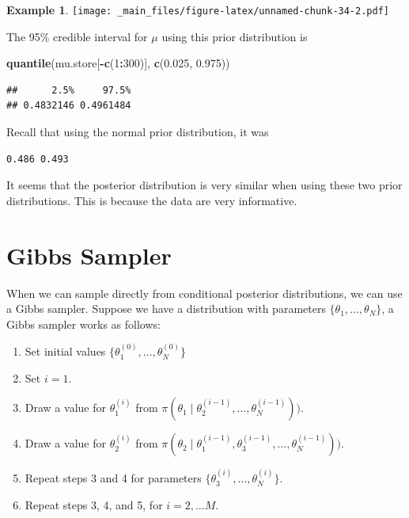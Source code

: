 \documentclass[
]{book}
\newenvironment{Shaded}{\begin{snugshade}}{\end{snugshade}}
\newcommand{\DecValTok}[1]{\textcolor[rgb]{0.00,0.00,0.81}{#1}}
\newcommand{\FloatTok}[1]{\textcolor[rgb]{0.00,0.00,0.81}{#1}}
\newcommand{\FunctionTok}[1]{\textcolor[rgb]{0.13,0.29,0.53}{\textbf{#1}}}
\newcommand{\NormalTok}[1]{#1}
\newcommand{\SpecialCharTok}[1]{\textcolor[rgb]{0.81,0.36,0.00}{\textbf{#1}}}
\theoremstyle{definition}
\theoremstyle{definition}
\newtheorem{example}{Example}[chapter]
\theoremstyle{definition}
\theoremstyle{definition}
\theoremstyle{remark}
\begin{document}
\begin{example}
\texttt{[image: \_main\_files/figure-latex/unnamed-chunk-34-2.pdf]}

The 95\% credible interval for \(\mu\) using this prior distribution is

\begin{Shaded}
\begin{Highlighting}[]
\FunctionTok{quantile}\NormalTok{(mu.store[}\SpecialCharTok{{-}}\FunctionTok{c}\NormalTok{(}\DecValTok{1}\SpecialCharTok{:}\DecValTok{300}\NormalTok{)], }\FunctionTok{c}\NormalTok{(}\FloatTok{0.025}\NormalTok{, }\FloatTok{0.975}\NormalTok{))}
\end{Highlighting}
\end{Shaded}

\begin{verbatim}
##      2.5%     97.5% 
## 0.4832146 0.4961484
\end{verbatim}

Recall that using the normal prior distribution, it was

\begin{verbatim}
0.486 0.493
\end{verbatim}

It seems that the posterior distribution is very similar when using these two prior distributions. This is because the data are very informative.
\end{example}

\hypertarget{gibbs-sampler}{%
\section{Gibbs Sampler}\label{gibbs-sampler}}

When we can sample directly from conditional posterior distributions, we can use a Gibbs sampler. Suppose we have a distribution with parameters \(\{\theta_1, \ldots, \theta_N\}\), a Gibbs sampler works as follows:

\begin{enumerate}
\def\labelenumi{\arabic{enumi}.}
\item
  Set initial values \(\{\theta_1^{(0)}, \ldots, \theta_N^{(0)}\}\)
\item
  Set \(i = 1\).
\item
  Draw a value for \(\theta_1^{(i)}\) from \(\pi(\theta_1 \mid \theta_2^{(i-1)}, \ldots, \theta_N^{(i-1)}))\).
\item
  Draw a value for \(\theta_2^{(i)}\) from \(\pi(\theta_2 \mid \theta_1^{(i-1)}, \theta_3^{(i-1)}, \ldots, \theta_N^{(i-1)}))\).
\item
  Repeat steps 3 and 4 for parameters \(\{\theta_3^{(i)}, \ldots, \theta_N^{(i)}\}\).
\item
  Repeat steps 3, 4, and 5, for \(i = 2, \ldots M\).
\end{enumerate}
\end{document}
